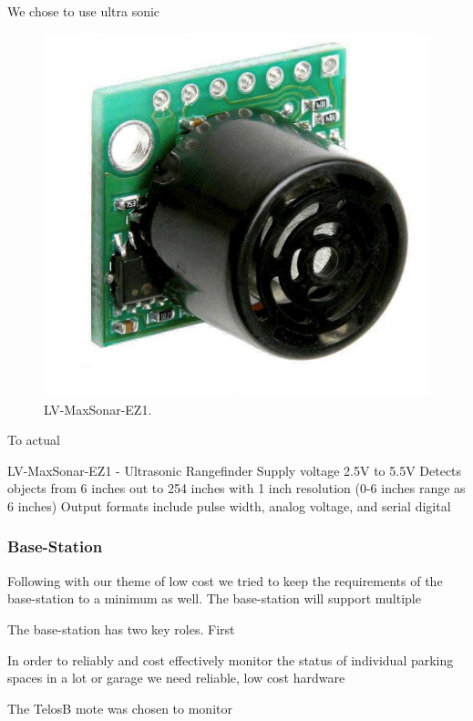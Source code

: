 \documentclass{acm_proc}
\begin{document}
We chose to use ultra sonic 

\begin{figure}[h]
    \begin{center}
		\includegraphics[width=\columnwidth]{figures/range_finder}
	\end{center}
	\caption{LV-MaxSonar-EZ1.}
	\label{fig:range_finder}
\end{figure}

To actual

LV-MaxSonar-EZ1 - Ultrasonic Rangefinder
Supply voltage 2.5V to 5.5V
Detects objects from 6 inches out to 254 inches with 1 inch resolution (0-6 inches range as 6 inches)
Output formats include pulse width, analog voltage, and serial digital

\subsubsection{Base-Station}
Following with our theme of low cost we tried to keep the requirements of the base-station to a minimum as well.  The base-station will support multiple 

The base-station has two key roles.  First

In order to reliably and cost effectively  monitor the status of individual parking spaces in a lot or garage we need reliable, low cost hardware

The TelosB mote was chosen to monitor 
\end{document}
